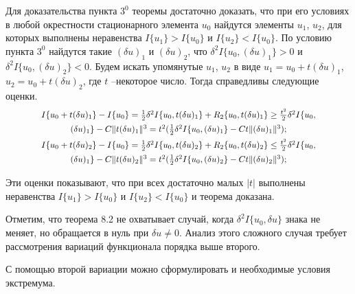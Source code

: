 	\newpage
	Для доказательства пункта $3^0$ теоремы достаточно доказать, что при его условиях в любой окрестности стационарного элемента $u_0$ найдутся элементы $u_1$, $u_2$, для которых выполнены неравенства $I\{u_1\}>I\{u_0\}$ и $I\{u_2\}<I\{u_0\}$. По условию пункта $3^0$ найдутся такие $(\delta u)_1$ и $(\delta u)_2$, что $\delta^2 I\{u_0,(\delta u)_1\}>0$ и $\delta^2 I\{u_0,(\delta u)_2\}<0$. Будем искать упомянутые $u_1$, $u_2$ в виде $u_1=u_0+t(\delta u)_1$, $u_2=u_0+t(\delta u)_2$, где $t$ –некоторое число. Тогда справедливы следующие оценки.
	\begin{gather}
	\scalebox{.9}{$I\{u_0+t(\delta u)_1\}-I\{u_0\}=\frac{1}{2}\delta^2 I\{u_0,t(\delta u)_1\}+R_2\{u_0,t(\delta u)_1\}\geq \frac{t^2}{2} \delta^2 I\{u_0,$} \notag\\
	\scalebox{.9}{\((\delta u)_1\}- C\|t(\delta u)_1\|^3=t^2(\frac{1}{2} \delta^2 I\{u_0,(\delta u)_1\} - Ct \|(\delta u)_1\|^3)\text{;}\)}\notag\\
	\scalebox{.9}{$I\{u_0+t(\delta u)_2\}-I\{u_0\}=\frac{1}{2}\delta^2 I\{u_0,t(\delta u)_2\}+R_2\{u_0,t(\delta u)_2\}\le \frac{t^2}{2} \delta^2 I\{u_0,$} \notag\\
	\scalebox{.9}{$(\delta u)_1\}-C\|t(\delta u)_2\|^3=t^2(\frac{1}{2} \delta^2 I\{u_0,(\delta u)_2\}-Ct \| (\delta u)_2\|^3)\text{;}$}\notag
	\end{gather}

	Эти оценки показывают, что при всех достаточно малых $|t|$ выполнены неравенства $I\{u_1\}>I\{u_0\}$ и $I\{u_2\}<I\{u_0\}$ и теорема доказана.

	Отметим, что теорема 8.2 не охватывает случай, когда $\delta^2 I\{u_0,\delta u\}$ знака не меняет, но обращается в нуль при $\delta u\neq 0$. Анализ этого сложного случая требует рассмотрения вариаций функционала порядка выше второго.

	С помощью второй вариации можно сформулировать и необходимые условия экстремума.


